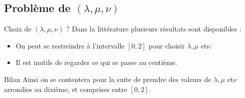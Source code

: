 \documentclass{beamer}
\begin{document}
\subsection{Problème de $(\lambda,\mu,\nu)$}

\begin{frame}{Choix de $(\lambda,\mu,\nu)$ ?}
Dans la littérature plusieurs résultats sont disponibles :
\begin{itemize}
\item On peut se restreindre à l'intervalle $[0,2]$ pour choisir $\lambda, \mu$ et$ \nu$.
\item Il est inutile de regarder ce qui se passe au centième.
\end{itemize}

\begin{exampleblock}{Bilan}
Ainsi on se contentera pour la suite de prendre des valeurs de $\lambda, \mu$ et$ \nu$ arrondies au dixième, et comprises entre $[0,2]$.
\end{exampleblock}

\end{frame}
\end{document}
